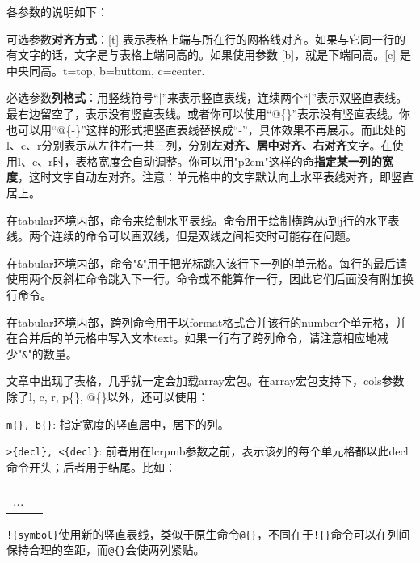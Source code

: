 {各参数的说明如下：
\begin{feai}
\item 可选参数\textbf{对齐方式}：[t] 表示表格上端与所在行的网格线对齐。如果与它同一行的有文字的话，文字是与表格上端同高的。如果使用参数 [b]，就是下端同高。[c] 是中央同高。t=top, b=buttom, c=center. 
\item 必选参数\textbf{列格式}：用竖线符号“|”来表示竖直表线，连续两个“|”表示双竖直表线。最右边留空了，表示没有竖直表线。或者你可以使用“@\{\}”表示没有竖直表线。你也可以用“@\{-\}”这样的形式把竖直表线替换成“-”，具体效果不再展示。而此处的l、c、r分别表示从左往右一共三列，分别\textbf{左对齐、居中对齐、右对齐}文字。在使用l、c、r时，表格宽度会自动调整。你可以用"p{2em}"这样的命\textbf{指定某一列的宽度}，这时文字自动左对齐。注意：单元格中的文字默认向上水平表线对齐，即竖直居上。
\item 在tabular环境内部，命令\latexline{\\hline}来绘制水平表线。命令用于绘制横跨从i到j行的水平表线。两个连续的\latexline{\\hline}命令可以画双线，但是双线之间相交时可能存在问题。
\item 在tabular环境内部，命令"\texttt{\&}"用于把光标跳入该行下一列的单元格。每行的最后请使用两个反斜杠命令跳入下一行。命令\latexline{\\hline}或\latexline{\\cline}不能算作一行，因此它们后面没有附加换行命令。
\item 在tabular环境内部，跨列命令用于以format格式合并该行的number个单元格，并在合并后的单元格中写入文本text。如果一行有了跨列命令，请注意相应地减少"\texttt{\&}"的数量。
\end{feai}

文章中出现了表格，几乎就一定会加载array宏包。在array宏包支持下，cols参数除了l, c, r, p\{\}, @\{\}以外，还可以使用：
\begin{feai}
\item \texttt{m\{\}, b\{\}}: 指定宽度的竖直居中，居下的列。
\item \verb|>{decl}, <{decl}|: 前者用在lcrpmb参数之前，表示该列的每个单元格都以此decl命令开头；后者用于结尾。比如：
\begin{latex}{}
\begin{tabular}{|>{\centering\ttfamily}p{5em}
    |>{$}c<{$}|}
...
\end{tabular}
\end{latex}
\item \verb|!{symbol}|使用新的竖直表线，类似于原生命令\texttt{@\{\}}，不同在于\verb|!{}|命令可以在列间保持合理的空距，而\verb|@{}|会使两列紧贴。
\end{feai}

}
